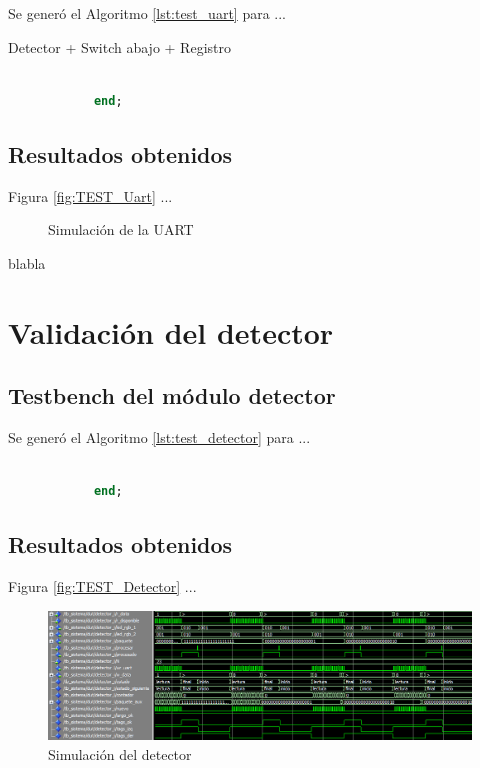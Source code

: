 		Se generó el Algoritmo \ref{lst:test_uart} para ...
		
		Detector + Switch abajo + Registro
			
		\begin{lstlisting}[language = vhdl,caption=Testbench del módulo UART,label={lst:test_uart}] 
				
			end;
		\end{lstlisting}
			
	\subsection{Resultados obtenidos}
		
		
			
		Figura \ref{fig:TEST_Uart} ...
		
		\begin{figure}[h]
		\centering
			\caption{Simulación de la UART}
			\label{fig:Test_UART}
		\end{figure}
			
		blabla
		
	
\section{Validación del detector}

	\subsection{Testbench del módulo detector}
			
		Se generó el Algoritmo \ref{lst:test_detector} para ...
		
			
		\begin{lstlisting}[language = vhdl,caption=Testbench del módulo detector,label={lst:test_detector}] 
				
			end;
		\end{lstlisting}
			
	\subsection{Resultados obtenidos}
				
		Figura \ref{fig:TEST_Detector} ...
		
		\begin{figure}[h]
		\centering
		\includegraphics[scale=0.5]{./Figures/Test/Detector}
			\caption{Simulación del detector}
			\label{fig:Test_Detector}
		\end{figure}
	
